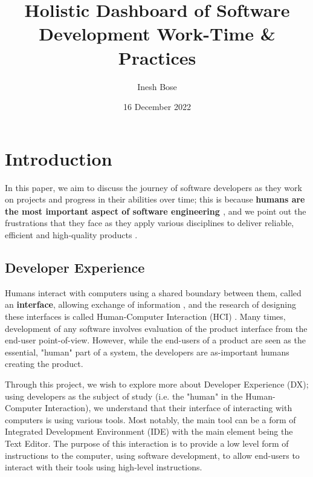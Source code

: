 \documentclass{mprop}
\begin{document}
\title{Holistic Dashboard of Software Development Work-Time \& Practices}
\author{Inesh Bose}
\date{16 December 2022}
\maketitle

\tableofcontents

\newpage
\section{Introduction}


In this paper, we aim to discuss the journey of software developers as they work on projects and progress in their abilities over time; this is because \textbf{humans are the most important aspect of software engineering \cite{martinAgileSoftwareDevelopment2003}}, and we point out the frustrations that they face as they apply various disciplines to deliver reliable, efficient and high-quality products \cite{sommervilleSoftwareEngineering1992}.

\subsection{Developer Experience}

Humans interact with computers using a shared boundary between them, called an \textbf{interface}, allowing exchange of information \cite{hookwayInterface2014}, and the research of designing these interfaces is called Human-Computer Interaction (HCI) \cite{cardPsychologyHumancomputerInteraction1983}. Many times, development of any software involves evaluation of the product interface from the end-user point-of-view. However, while the end-users of a product are seen as the essential, "human" part of a system, the developers are as-important humans creating the product.

Through this project, we wish to explore more about Developer Experience (DX); using developers as the subject of study (i.e. the "human" in the Human-Computer Interaction), we understand that their interface of interacting with computers is using various tools. Most notably, the main tool can be a form of Integrated Development Environment (IDE) with the main element being the Text Editor. The purpose of this interaction is to provide a low level form of instructions to the computer, using software development, to allow end-users to interact with their tools using high-level instructions.
\end{document}
